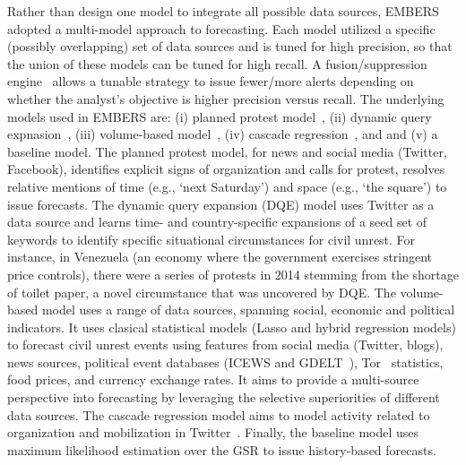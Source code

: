 Rather than design one model to integrate all possible data sources, EMBERS adopted a multi-model 
approach to forecasting. Each model utilized a specific (possibly overlapping) set of data sources
and is tuned for high precision, so that the union of these models can be tuned for high recall.
A fusion/suppression engine~\cite{andy-scotland-paper} allows a tunable strategy to issue fewer/more
alerts depending on whether the analyst's objective is higher precision versus recall. The
underlying models used in EMBERS are: (i) planned protest model~\cite{pp-paper1,pp-paper2},
(ii) dynamic query expnasion~\cite{dqe-plosone}, (iii) volume-based model~\cite{asonam},
(iv) cascade regression~\cite{anil-plosone}, and
and (v) a baseline model. The planned protest model, for news and social media (Twitter, Facebook),
identifies explicit signs of organization and calls
for protest, resolves relative mentions of time (e.g., `next Saturday') and space (e.g., `the square')
to issue forecasts. The dynamic query expansion (DQE) model uses Twitter as a data source and learns time- and country-specific
expansions of a seed set of keywords to identify specific situational circumstances for civil unrest.
For instance, in Venezuela (an economy where the government exercises stringent price controls),
there were a series of protests in 2014 stemming from the shortage of toilet paper, a novel circumstance
that was uncovered by DQE. The volume-based model uses a range of data sources, spanning
social, economic
and political indicators. It uses clasical statistical models (Lasso
and hybrid regression models) to forecast civil unrest events using features
from social media (Twitter, blogs), news sources, 
political event databases (ICEWS and GDELT~\cite{gdelt}), Tor~\cite{tor} statistics, food prices, and currency
exchange rates. It aims to provide a multi-source perspective into forecasting by leveraging
the selective superiorities of different data sources. The cascade regression model
aims to model activity related to organization and mobilization in Twitter~\cite{anil-plosone}.
Finally, the baseline model uses maximum likelihood
estimation over the GSR to issue history-based forecasts.

